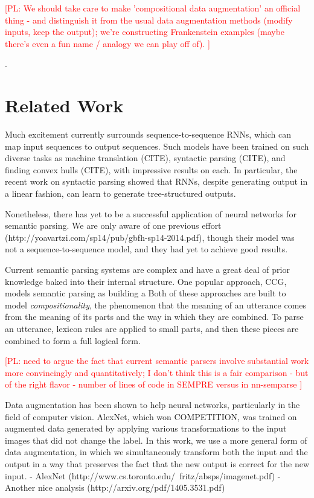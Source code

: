 \documentclass[11pt,letterpaper]{article}
\newcommand\pl[1]{\textcolor{red}{[PL: #1]}}
\begin{document}
\pl{
  We should take care to make 'compositional data augmentation'
  an official thing - and distinguish it from the usual data augmentation methods
  (modify inputs, keep the output); we're constructing Frankenstein examples
  (maybe there's even a fun name / analogy we can play off of).
}

\cite{liang2013lambdadcs}.

\section{Related Work}
Much excitement currently surrounds sequence-to-sequence RNNs,
which can map input sequences to output sequences.
Such models have been trained on such diverse tasks as
machine translation (CITE), syntactic parsing (CITE), and 
finding convex hulls (CITE), with impressive results on each.
In particular, the recent work on syntactic parsing showed that
RNNs, despite generating output in a linear fashion, can 
learn to generate tree-structured outputs.

Nonetheless, there has yet to be a successful application of
neural networks for semantic parsing.
We are only aware of one previous effort 
(http://yoavartzi.com/sp14/pub/gbfh-sp14-2014.pdf),
though their model was not a sequence-to-sequence model,
and they had yet to achieve good results.

Current semantic parsing systems are
complex and have a great deal of prior knowledge
baked into their internal structure.
One popular approach, CCG, models semantic parsing as 
building a 
Both of these approaches are built to model \emph{compositionality},
the phenomenon that the meaning of an utterance comes from
the meaning of its parts and the way in which they are combined.
To parse an utterance, lexicon rules are applied to
small parts, and then these pieces are combined to form a full
logical form.

\pl{need to argue the fact that current semantic parsers involve substantial
  work more convincingly and quantitatively;
  I don't think this is a fair comparison - but of the right flavor - number of lines
  of code in SEMPRE versus in nn-semparse
}

Data augmentation has been shown to help neural networks,
particularly in the field of computer vision.
AlexNet, which won COMPETITION, was trained on 
augmented data generated by applying various transformations
to the input images that did not change the label.
In this work, we use a more general form of data augmentation,
in which we simultaneously transform both the input and the output
in a way that preserves the fact that the new output is correct
for the new input.
- AlexNet (http://www.cs.toronto.edu/~fritz/absps/imagenet.pdf) 
- Another nice analysis (http://arxiv.org/pdf/1405.3531.pdf) 
\end{document}
